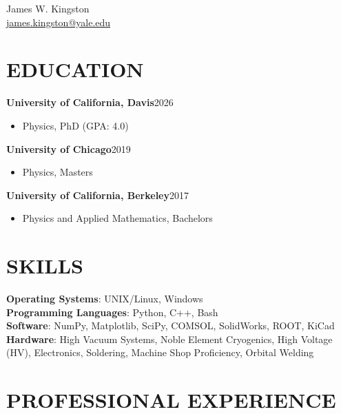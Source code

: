 \documentclass[11pt,letterpaper]{article}
\newcommand{\entry}[2]{%
  \needspace{3\baselineskip}%
  \noindent\textbf{#1}\hfill #2\par}
\begin{document}
\begin{center}
  {\Large James W. Kingston}\\[2pt]
  \href{mailto:james.kingston@yale.edu}{james.kingston@yale.edu}
\end{center}
\vspace{0.5\baselineskip}

\section*{EDUCATION}

\entry{University of California, Davis}{2026}
\begin{itemize}
  \item Physics, PhD (GPA: 4.0)
\end{itemize}

\entry{University of Chicago}{2019}
\begin{itemize}
  \item Physics, Masters
\end{itemize}

\entry{University of California, Berkeley}{2017}
\begin{itemize}
  \item Physics and Applied Mathematics, Bachelors
\end{itemize}

\section*{SKILLS}

\textbf{Operating Systems}: UNIX/Linux, Windows\\
\textbf{Programming Languages}: Python, C++, Bash\\
\textbf{Software}: NumPy, Matplotlib, SciPy, COMSOL, SolidWorks, ROOT, KiCad\\
\textbf{Hardware}: High Vacuum Systems, Noble Element Cryogenics, High Voltage (HV),
Electronics, Soldering, Machine Shop Proficiency, Orbital Welding

\section*{PROFESSIONAL EXPERIENCE}
\end{document}

